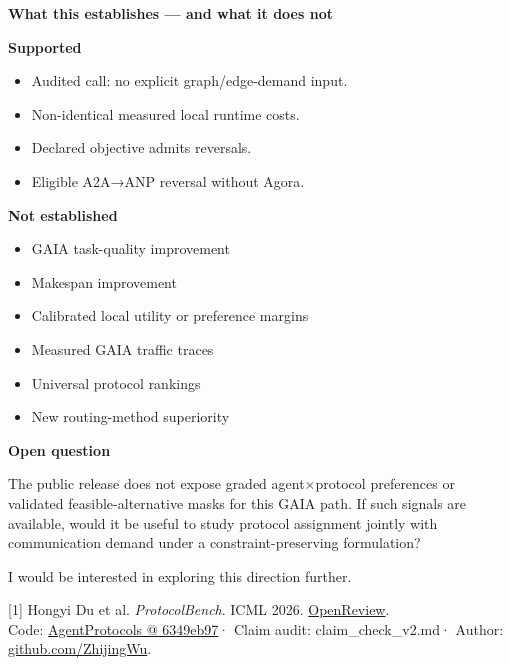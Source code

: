 \documentclass[11pt,a4paper]{article}
\newlength{\gridcol}
\newcommand{\auxfont}{\fontsize{9.5}{12.5}\selectfont}
\newcommand{\sectionlabel}[1]{\par{\fontsize{13}{16}\selectfont\bfseries #1}\par\vspace{6pt}}
\begin{document}
\vspace{17pt}
\sectionlabel{What this establishes — and what it does not}
\begin{minipage}[t]{\gridcol}\raggedright
\textbf{Supported}
\begin{itemize}
\item Audited call: no explicit graph/edge-demand input.
\item Non-identical measured local runtime costs.
\item Declared objective admits reversals.
\item Eligible A2A→ANP reversal without Agora.
\end{itemize}
\end{minipage}\hspace{\columnsep}%
\begin{minipage}[t]{\gridcol}\raggedright
\textbf{Not established}
\begin{itemize}
\item GAIA task-quality improvement
\item Makespan improvement
\item Calibrated local utility or preference margins
\item Measured GAIA traffic traces
\item Universal protocol rankings
\item New routing-method superiority
\end{itemize}
\end{minipage}\par

\vspace{15pt}
\sectionlabel{Open question}
The public release does not expose graded agent×protocol preferences or validated
feasible-alternative masks for this GAIA path. If such signals are available,
would it be useful to study protocol assignment jointly with communication demand
under a constraint-preserving formulation?

I would be interested in exploring this direction further.

\vfill
{\auxfont\color{muted}\raggedright
[1] Hongyi Du et al. \textit{ProtocolBench}. ICML 2026.
\href{https://openreview.net/forum?id=GZRiXE2zBe}{OpenReview}.\\[3pt]
Code: \href{https://github.com/ulab-uiuc/AgentProtocols/tree/6349eb97f0ca83db9cbfd44dea0bbdbb3ea9d37f}{AgentProtocols @ 6349eb97}\enspace·\enspace
Claim audit: claim\_check\_v2.md\enspace·\enspace
Author: \href{https://github.com/ZhijingWu}{github.com/ZhijingWu}.
\par}
\end{document}
